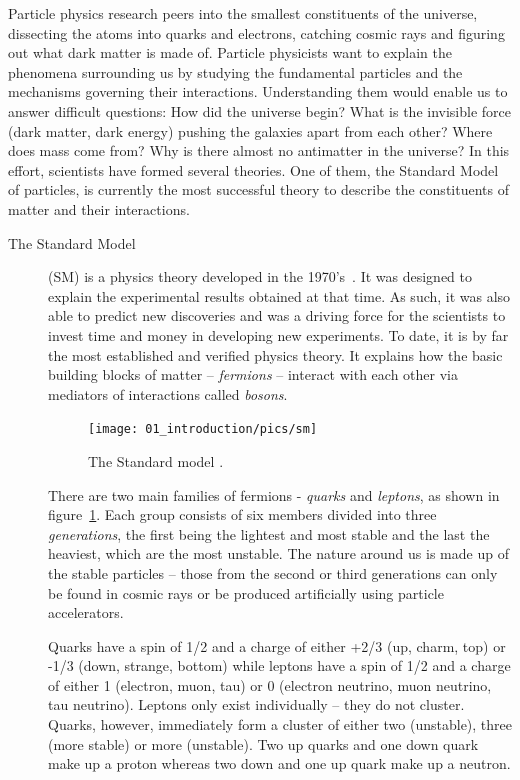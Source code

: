 Particle physics research peers into the smallest constituents of the universe, dissecting the atoms into quarks and electrons, catching cosmic rays and figuring out what dark matter is made of. Particle physicists want to explain the phenomena surrounding us by studying the fundamental particles and the mechanisms governing their interactions. Understanding them would enable us to answer difficult questions: How did the universe begin? What is the invisible force (dark matter, dark energy) pushing the galaxies apart from each other? Where does mass come from? Why is there almost no antimatter in the universe? In this effort, scientists have formed several theories. One of them, the Standard Model of particles, is currently the most successful theory to describe the constituents of matter and their interactions.

\begin{description}
\item[The Standard Model]
(SM) is a physics theory developed in the 1970's~\cite{Novaes:1999yn}. It was designed to explain the experimental results obtained at that time. As such, it was also able to predict new discoveries and was a driving force for the scientists to invest time and money in developing new experiments. To date, it is by far the most established and verified physics theory. It explains how the basic building blocks of matter -- \emph{fermions} -- interact with each other via mediators of interactions called \emph{bosons}.  
\begin{figure}[!t]
\centering
\texttt{[image: 01\_introduction/pics/sm]}
\caption{The Standard model \cite{Dominguez:2002395}.}
\label{fig:sm1}
\end{figure}
There are two main families of fermions - \emph{quarks} and \emph{leptons}, as shown in figure~\ref{fig:sm1}. Each group consists of six members divided into three \emph{generations}, the first being the lightest and most stable and the last the heaviest, which are the most unstable. The nature around us is made up of the stable particles -- those from the second or third generations can only be found in cosmic rays or be produced artificially using particle accelerators.

Quarks have a spin of 1/2 and a charge of either +2/3 (up, charm, top)  or -1/3  (down, strange, bottom) while leptons have a spin of 1/2  and a charge of either 1 (electron, muon, tau) or 0 (electron neutrino, muon neutrino, tau neutrino). Leptons only exist individually -- they do not cluster. Quarks, however, immediately form a cluster of either two (unstable), three (more stable) or more (unstable). Two up quarks and one down quark make up a proton whereas two down and one up quark make up a neutron.


\end{description}
